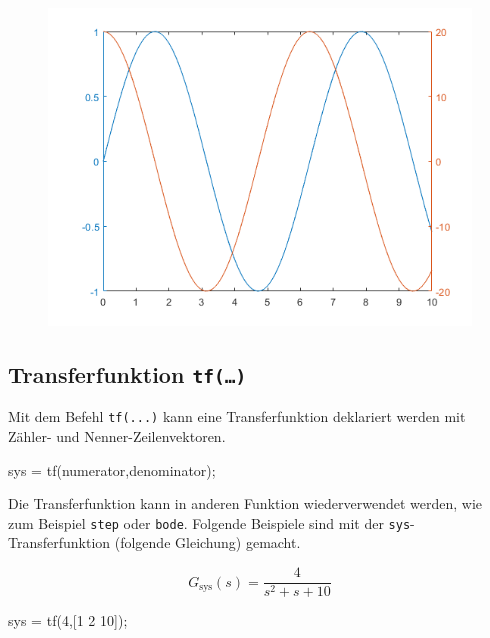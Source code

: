 \documentclass[
  10pt,
  a4paper,
]{article}
\newenvironment{Shaded}{}{}
\newcommand{\FloatTok}[1]{\textcolor[rgb]{0.00,0.36,0.77}{#1}}
\newcommand{\NormalTok}[1]{\textcolor[rgb]{0.14,0.16,0.18}{#1}}
\newcommand{\OperatorTok}[1]{\textcolor[rgb]{0.14,0.16,0.18}{#1}}
\newcommand{\VariableTok}[1]{\textcolor[rgb]{0.89,0.38,0.04}{#1}}
\numberwithin{equation}{section}
\begin{document}
\begin{multicols}{2}
\begin{figure}[H]

{\centering \includegraphics{images/plotyy.png}

}

\end{figure}

\hypertarget{transferfunktion-tf}{%
\subsection{\texorpdfstring{Transferfunktion
\texttt{tf(…)}}{Transferfunktion tf(\ldots)}}\label{transferfunktion-tf}}

Mit dem Befehl \texttt{tf(...)} kann eine Transferfunktion deklariert
werden mit Zähler- und Nenner-Zeilenvektoren.

\begin{Shaded}
\begin{Highlighting}[]
\VariableTok{sys} \OperatorTok{=} \VariableTok{tf}\NormalTok{(}\VariableTok{numerator}\OperatorTok{,}\VariableTok{denominator}\NormalTok{)}\OperatorTok{;}
\end{Highlighting}
\end{Shaded}

Die Transferfunktion kann in anderen Funktion wiederverwendet werden,
wie zum Beispiel \texttt{step} oder \texttt{bode}. Folgende Beispiele
sind mit der \texttt{sys}-Transferfunktion (folgende Gleichung) gemacht.

\[
G_{\text{sys}}(s) = \frac{4}{s^2+s+10}
\]

\begin{Shaded}
\begin{Highlighting}[]
\VariableTok{sys} \OperatorTok{=} \VariableTok{tf}\NormalTok{(}\FloatTok{4}\OperatorTok{,}\NormalTok{[}\FloatTok{1} \FloatTok{2} \FloatTok{10}\NormalTok{])}\OperatorTok{;}
\end{Highlighting}
\end{Shaded}


\end{multicols}
\end{document}

